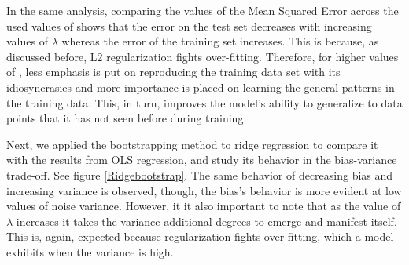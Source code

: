 \documentclass{article}
\begin{document}
In the same analysis, comparing the values of the Mean Squared Error across the used values of  shows that the error on the test set decreases with increasing values of $\lambda$ whereas the error of the training set increases. This is because, as discussed before, L2 regularization fights over-fitting. Therefore, for higher values of , less emphasis is put on reproducing the training data set with its idiosyncrasies and more importance is placed on learning the general patterns in the training data. This, in turn, improves the model’s ability to generalize to data points that it has not seen before during training.

Next, we applied the bootstrapping method to ridge regression to compare it with the results from OLS regression, and study its behavior in the bias-variance trade-off. See figure \ref{Ridgebootstrap}. The same behavior of decreasing bias and increasing variance is observed, though, the bias’s behavior is more evident at low values of noise variance. However, it it also important to note that as the value of $\lambda$ increases it takes the variance additional degrees to emerge and manifest itself. This is, again, expected because regularization fights over-fitting, which a model exhibits when the variance is high.
\end{document}
